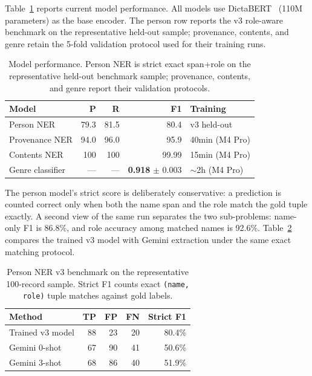 \documentclass[Afour,sageh,times]{sagej}
\begin{document}
Table~\ref{tab:ner-results} reports current model performance. All models use DictaBERT~\cite{shmidman2023dictabert} (110M parameters) as the base encoder. The person row reports the v3 role-aware benchmark on the representative held-out sample; provenance, contents, and genre retain the 5-fold validation protocol used for their training runs.

\begin{table}[t]
\caption{Model performance. Person NER is strict exact span+role on the representative held-out benchmark sample; provenance, contents, and genre report their validation protocols.}
\label{tab:ner-results}
\centering
\footnotesize
\setlength{\tabcolsep}{3.5pt}
\begin{tabular}{lrrrl}
\toprule
\textbf{Model} & \textbf{P} & \textbf{R} & \textbf{F1} & \textbf{Training} \\
\midrule
Person NER       & 79.3 & 81.5 & 80.4  & v3 held-out  \\
Provenance NER   & 94.0 & 96.0 & 95.9  & 40min (M4 Pro)  \\
Contents NER     & 100  & 100  & 99.99 & 15min (M4 Pro)  \\
Genre classifier & —    & —    & \textbf{0.918} $\pm$ 0.003  & $\sim$2h (M4 Pro) \\
\bottomrule
\end{tabular}
\end{table}

The person model's strict score is deliberately conservative: a prediction is counted correct only when both the name span and the role match the gold tuple exactly. A second view of the same run separates the two sub-problems: name-only F1 is 86.8\%, and role accuracy among matched names is 92.6\%. Table~\ref{tab:person-v3-gemini} compares the trained v3 model with Gemini extraction under the same exact matching protocol.

\begin{table}[t]
\caption{Person NER v3 benchmark on the representative 100-record sample. Strict F1 counts exact \texttt{(name, role)} tuple matches against gold labels.}
\label{tab:person-v3-gemini}
\centering
\small
\begin{tabular}{lrrrr}
\toprule
\textbf{Method} & \textbf{TP} & \textbf{FP} & \textbf{FN} & \textbf{Strict F1} \\
\midrule
Trained v3 model & 88 & 23 & 20 & 80.4\% \\
Gemini 0-shot    & 67 & 90 & 41 & 50.6\% \\
Gemini 3-shot    & 68 & 86 & 40 & 51.9\% \\
\bottomrule
\end{tabular}
\end{table}
\end{document}
